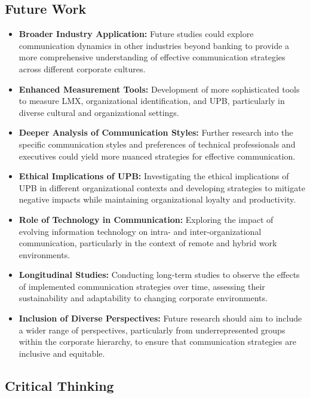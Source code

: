 \documentclass[runningheads]{llncs}
\begin{document}
\subsection{Future Work}
\begin{itemize}
    \item \textbf{Broader Industry Application:} Future studies could explore communication dynamics in other industries beyond banking to provide a more comprehensive understanding of effective communication strategies across different corporate cultures.
    \item \textbf{Enhanced Measurement Tools:} Development of more sophisticated tools to measure LMX, organizational identification, and UPB, particularly in diverse cultural and organizational settings.
    \item \textbf{Deeper Analysis of Communication Styles:} Further research into the specific communication styles and preferences of technical professionals and executives could yield more nuanced strategies for effective communication.
    \item \textbf{Ethical Implications of UPB:} Investigating the ethical implications of UPB in different organizational contexts and developing strategies to mitigate negative impacts while maintaining organizational loyalty and productivity.
    \item \textbf{Role of Technology in Communication:} Exploring the impact of evolving information technology on intra- and inter-organizational communication, particularly in the context of remote and hybrid work environments.
    \item \textbf{Longitudinal Studies:} Conducting long-term studies to observe the effects of implemented communication strategies over time, assessing their sustainability and adaptability to changing corporate environments. \cite{ref_article02}
    \item \textbf{Inclusion of Diverse Perspectives:} Future research should aim to include a wider range of perspectives, particularly from underrepresented groups within the corporate hierarchy, to ensure that communication strategies are inclusive and equitable.
\end{itemize}

\subsection{Critical Thinking}
\end{document}
